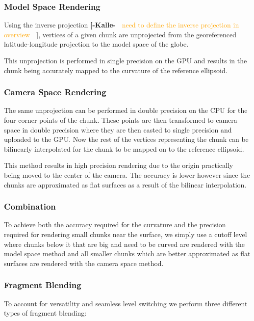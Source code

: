 \documentclass[journal]{vgtc}                %
\newcommand{\kallecomment}[1]{\textbf{[-Kalle-~}
    \textcolor{orange}{#1}
    \textbf{~]}}
\begin{document}
\subsubsection{Model Space Rendering}

Using the inverse projection \kallecomment{need to define the inverse projection in overview}, vertices of a given chunk are unprojected from the georeferenced latitude-longitude projection to the model space of the globe.

This unprojection is performed in single precision on the GPU and results in the chunk being accurately mapped to the curvature of the reference ellipsoid.
 
\subsubsection{Camera Space Rendering}

The same unprojection can be performed in double precision on the CPU for the four corner points of the chunk.
These points are then transformed to camera space in double precision where they are then casted to single precision and uploaded to the GPU.
Now the rest of the vertices representing the chunk can be bilinearly interpolated for the chunk to be mapped on to the reference ellipsoid.

This method results in high precision rendering due to the origin practically being moved to the center of the camera.
The accuracy is lower however since the chunks are approximated as flat surfaces as a result of the bilinear interpolation.

\subsubsection{Combination}

To achieve both the accuracy required for the curvature and the precision required for rendering small chunks near the surface, we simply use a cutoff level where chunks below it that are big and need to be curved are rendered with the model space method and all smaller chunks which are better approximated as flat surfaces are rendered with the camera space method.

\subsubsection{Fragment Blending}

To account for versatility and seamless level switching we perform three different types of fragment blending:
\end{document}
